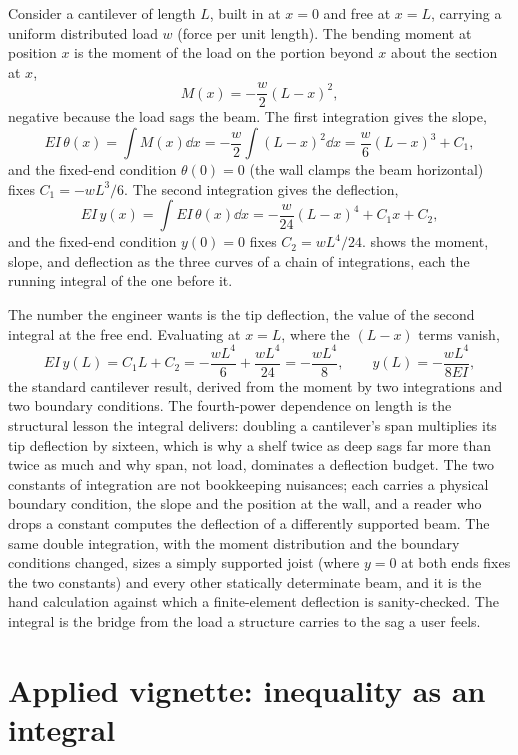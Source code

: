 Consider a cantilever of length $L$, built in at $x = 0$ and free at
$x = L$, carrying a uniform distributed load $w$ (force per unit length).
The bending moment at position $x$ is the moment of the load on the
portion beyond $x$ about the section at $x$,
\[
M(x) = -\frac{w}{2}(L - x)^{2},
\]
negative because the load sags the beam. The first integration gives the
slope,
\[
EI\,\theta(x) = \int M(x)\dd x = -\frac{w}{2}\int (L - x)^{2}\dd x =
\frac{w}{6}(L - x)^{3} + C_{1},
\]
and the fixed-end condition $\theta(0) = 0$ (the wall clamps the beam
horizontal) fixes $C_{1} = -wL^{3}/6$. The second integration gives the
deflection,
\[
EI\,y(x) = \int EI\,\theta(x)\dd x = -\frac{w}{24}(L - x)^{4} +
C_{1}x + C_{2},
\]
and the fixed-end condition $y(0) = 0$ fixes $C_{2} = wL^{4}/24$.
 shows the moment, slope, and
deflection as the three curves of a chain of integrations, each the
running integral of the one before it.



The number the engineer wants is the tip deflection, the value of the
second integral at the free end. Evaluating at $x = L$, where the
$(L - x)$ terms vanish,
\[
EI\,y(L) = C_{1}L + C_{2} = -\frac{wL^{4}}{6} + \frac{wL^{4}}{24} =
-\frac{wL^{4}}{8}, \qquad y(L) = -\frac{wL^{4}}{8EI},
\]
the standard cantilever result, derived from the moment by two
integrations and two boundary conditions. The fourth-power dependence on
length is the structural lesson the integral delivers: doubling a
cantilever's span multiplies its tip deflection by sixteen, which is why
a shelf twice as deep sags far more than twice as much and why span, not
load, dominates a deflection budget. The two constants of integration
are not bookkeeping nuisances; each carries a physical boundary
condition, the slope and the position at the wall, and a reader who drops
a constant computes the deflection of a differently supported beam. The
same double integration, with the moment distribution and the boundary
conditions changed, sizes a simply supported joist (where $y = 0$ at both
ends fixes the two constants) and every other statically determinate
beam, and it is the hand calculation against which a finite-element
deflection is sanity-checked. The integral is the bridge from the load a
structure carries to the sag a user feels.

\section{Applied vignette: inequality as an integral}

